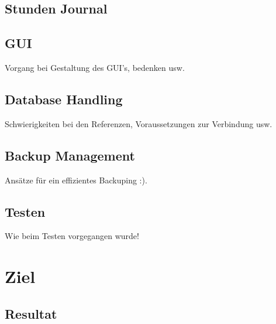 \documentclass{article}
\begin{document}
\subsection{Stunden Journal}
\subsection{GUI}
Vorgang bei Gestaltung des GUI's, bedenken usw.

\subsection{Database Handling}
Schwierigkeiten bei den Referenzen, Voraussetzungen zur Verbindung usw.

\subsection{Backup Management}
Ansätze für ein effizientes Backuping :).

\subsection{Testen}
Wie beim Testen vorgegangen wurde!

\newpage

\section{Ziel}
\subsection{Resultat}
\end{document}
